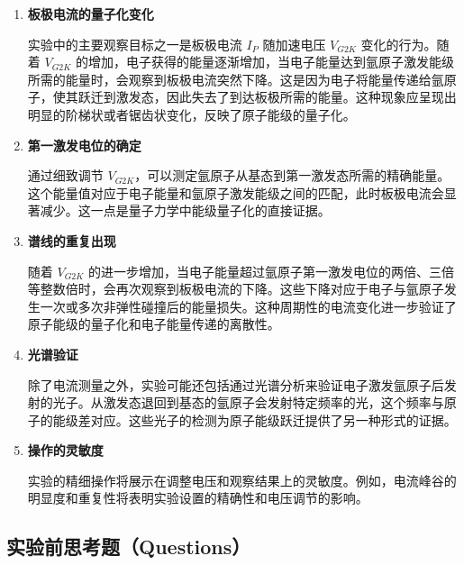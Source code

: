 \documentclass[dvipsnames, svgnames,a4paper,11pt]{article}
\begin{document}
\begin{enumerate}
		\begin{enumerate}
			\item \textbf{板极电流的量子化变化}
			
			实验中的主要观察目标之一是板极电流 \( I_P \) 随加速电压 \( V_{G2K} \) 变化的行为。随着 \( V_{G2K} \) 的增加，电子获得的能量逐渐增加，当电子能量达到氩原子激发能级所需的能量时，会观察到板极电流突然下降。这是因为电子将能量传递给氩原子，使其跃迁到激发态，因此失去了到达板极所需的能量。这种现象应呈现出明显的阶梯状或者锯齿状变化，反映了原子能级的量子化。
			
			\item \textbf{第一激发电位的确定}
			
			通过细致调节 \( V_{G2K} \)，可以测定氩原子从基态到第一激发态所需的精确能量。这个能量值对应于电子能量和氩原子激发能级之间的匹配，此时板极电流会显著减少。这一点是量子力学中能级量子化的直接证据。
			
			\item \textbf{谱线的重复出现}
			
			随着 \( V_{G2K} \) 的进一步增加，当电子能量超过氩原子第一激发电位的两倍、三倍等整数倍时，会再次观察到板极电流的下降。这些下降对应于电子与氩原子发生一次或多次非弹性碰撞后的能量损失。这种周期性的电流变化进一步验证了原子能级的量子化和电子能量传递的离散性。
			
			\item \textbf{光谱验证}
			
			除了电流测量之外，实验可能还包括通过光谱分析来验证电子激发氩原子后发射的光子。从激发态退回到基态的氩原子会发射特定频率的光，这个频率与原子的能级差对应。这些光子的检测为原子能级跃迁提供了另一种形式的证据。
			
			\item \textbf{操作的灵敏度}
			
			实验的精细操作将展示在调整电压和观察结果上的灵敏度。例如，电流峰谷的明显度和重复性将表明实验设置的精确性和电压调节的影响。
		\end{enumerate}
		
	\end{enumerate}
	
	
	
	\subsection{实验前思考题（Questions）}
	
\end{document}
